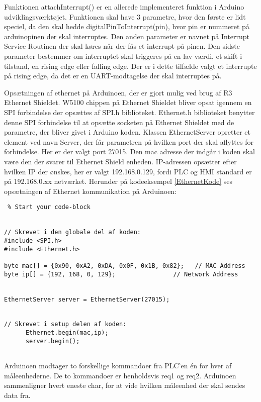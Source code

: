 Funktionen attachInterrupt() er en allerede implementeret funktion i Arduino udviklingsværktøjet. Funktionen skal have 3 parametre, hvor den første er lidt speciel, da den skal hedde digitalPinToInterrupt(pin), hvor pin er nummeret på arduinopinen der skal interruptes. Den anden parameter er navnet på Interrupt Service Routinen der skal køres når der fås et interrupt på pinen. Den sidste parameter bestemmer om interruptet skal triggeres på en lav værdi, et skift i tilstand, en rising edge eller falling edge. Der er i dette tilfælde valgt et interrupte på rising edge, da det er en UART-modtagelse der skal interruptes på. 

Opsætningen af ethernet på Arduinoen, der er gjort mulig ved brug af R3 Ethernet Shieldet. W5100 chippen på Ethernet Shieldet bliver opsat igennem en SPI forbindelse der opsættes af SPI.h biblioteket. Ethernet.h biblioteket benytter denne SPI forbindelse til at opsætte socketen på Ethernet Shieldet med de parametre, der bliver givet i Arduino koden. Klassen EthernetServer opretter et element ved navn Server, der får parametren på hvilken port der skal aflyttes for forbindelse. Her er der valgt port 27015. Den mac adresse der indgår i koden skal være den der svarer til Ethernet Shield enheden. IP-adressen opsætter efter hvilken IP der ønskes, her er valgt 192.168.0.129, fordi PLC og HMI standard er på 192.168.0.xx netværket. Herunder på kodeeksempel \ref{EthernetKode} ses opsætningen af Ethernet kommunikation på Arduinoen:


\begin{lstlisting} % Start your code-block


// Skrevet i den globale del af koden:
#include <SPI.h>
#include <Ethernet.h>

byte mac[] = {0x90, 0xA2, 0xDA, 0x0F, 0x1B, 0x82};   // MAC Address
byte ip[] = {192, 168, 0, 129};                // Network Address


EthernetServer server = EthernetServer(27015);


// Skrevet i setup delen af koden:
      Ethernet.begin(mac,ip);
      server.begin();


\end{lstlisting}

Arduinoen modtager to forskellige kommandoer fra PLC'en én for hver af måleenhederne. De to kommandoer er henholdsvis req1 og req2. Arduinoen sammenligner hvert eneste char, for at vide hvilken måleenhed der skal sendes data fra. 


